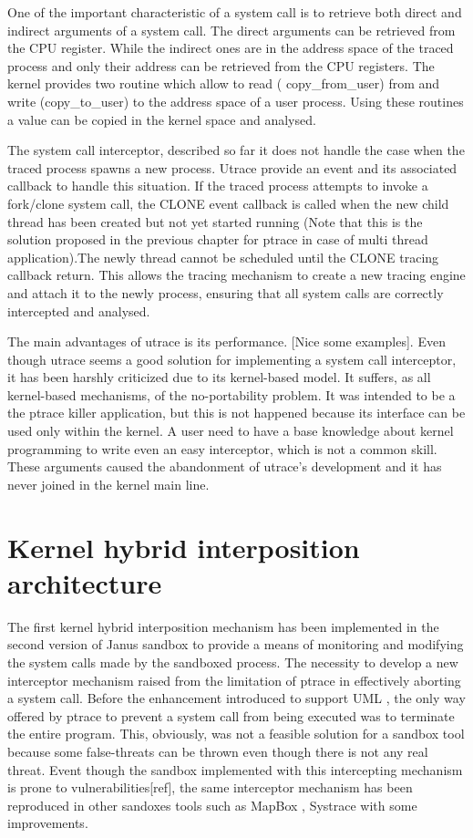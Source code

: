 One of the important characteristic of a system call is to retrieve both direct and indirect arguments of a system call. The direct arguments can be retrieved from the CPU register. While the indirect ones are in the address space of the traced process and only their address can be retrieved from the CPU registers. The kernel provides two routine which allow to read ( copy\_from\_user) from and write (copy\_to\_user) to the address space of a user process. Using these routines a value can be copied in the kernel space and analysed. 

The system call interceptor, described so far it does not handle the case when the traced process spawns a new process. Utrace provide an event and its associated callback to handle this situation. If the traced process attempts to invoke a fork/clone system call, the CLONE event callback is called when the new child thread has been created but not yet started running (Note that this is the solution proposed in the previous chapter for ptrace in case of multi thread application).The newly thread cannot be scheduled until the CLONE tracing callback return. 
This allows the tracing mechanism to create a new tracing engine and attach it to the newly process, ensuring that all system calls are correctly intercepted and analysed. 
 
The main advantages of utrace is its performance. [Nice some examples]. Even though utrace seems a good solution for implementing a system call interceptor, it has been harshly criticized due to its kernel-based model. It suffers, as all kernel-based mechanisms, of the no-portability problem. It was intended to be a the ptrace killer application, but this is not happened because its interface can be used only within the kernel. A user need to have a base knowledge about kernel programming to write even an easy interceptor, which is not a common skill. These arguments caused the abandonment of utrace's development and it has never joined in the kernel main line. 

\section{Kernel hybrid interposition architecture}
\label{interceptor_mechanism}

The first kernel hybrid interposition mechanism has been implemented in  the second version of Janus sandbox \cite{Janus} to provide a means of monitoring and modifying the system calls made by the sandboxed process. The necessity to develop a new interceptor mechanism raised from the limitation of ptrace in effectively aborting a system call. Before the enhancement introduced to support UML \cite{UML_1,UML_2}, the only way offered by ptrace to prevent a system call from being executed was to terminate the entire program. This, obviously, was not a feasible solution for a sandbox tool because some false-threats can be thrown even though there is not any real threat. 
Event though the sandbox implemented with this intercepting mechanism is prone to vulnerabilities[ref], the same interceptor mechanism has been reproduced in other sandoxes tools such as MapBox \cite{MapBox}, Systrace \cite{Provos02improvinghost} with some improvements. 

